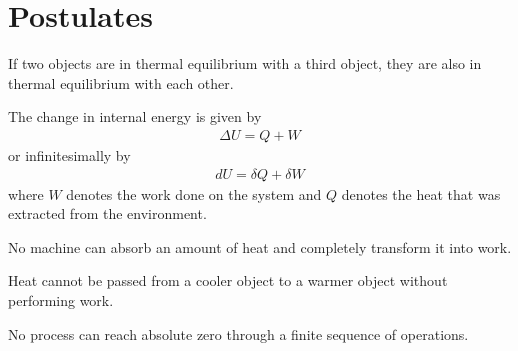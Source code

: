 \section{Postulates}

    \begin{axiom}
        If two objects are in thermal equilibrium with a third object, they are also in thermal equilibrium with each other.
    \end{axiom}
    \begin{axiom}
        The change in internal energy is given by
        \begin{gather}
            \label{thermo:first_law}
            \Delta U = Q + W
        \end{gather}
        or infinitesimally by
        \begin{gather}
            \label{thermo:first_law_differential}
            dU = \delta Q + \delta W
        \end{gather}
        where $W$ denotes the work done on the system and $Q$ denotes the heat that was extracted from the environment.
    \end{axiom}

    \begin{axiom}
        No machine can absorb an amount of heat and completely transform it into work.
    \end{axiom}
    \begin{axiom}
        Heat cannot be passed from a cooler object to a warmer object without performing work.
    \end{axiom}


    \begin{axiom}
        No process can reach absolute zero through a finite sequence of operations.
    \end{axiom}

